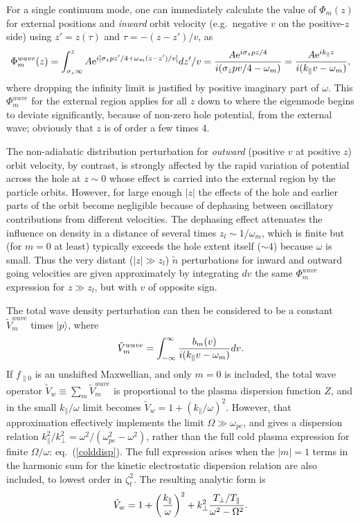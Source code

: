 \documentclass{jpp}
\def\ket#1{|#1\rangle}
\begin{document}
For a single continuum mode, one can immediately calculate the value
of $\Phi_m(z)$ for external positions and \emph{inward}
orbit velocity (e.g.\ negative $v$ on the positive-$z$ side) using
$z'=z(\tau)$ and $\tau=-(z-z')/v$, as
\begin{equation}
  \label{Phiwave}
  \Phi_{m}^{wave}(z) = \int_{\sigma_z\infty}^zA{\rm e}^{i[\sigma_zpz'/4+\omega_m
    (z-z')/v]}dz'/v
  ={A{\rm e}^{i\sigma_zpz/4} \over i(\sigma_zpv/4-\omega_m)}={A{\rm e}^{ik_\parallel z} \over
    i(k_\parallel v-\omega_m)},
\end{equation}
where dropping the infinity limit is justified by positive imaginary
part of $\omega$.  This $\Phi_{m}^{wave}$ for the external 
region applies for all $z$ down to where the eigenmode begins to
deviate significantly, because of non-zero hole potential, from the
external wave; obviously that $z$ is of order a few times 4.

The non-adiabatic distribution perturbation for \emph{outward}
(positive $v$ at positive $z$) orbit velocity, by contrast, is
strongly affected by the rapid variation of potential across the hole
at $z\sim 0$ whose effect is carried into the external region by the
particle orbits. However, for large enough $|z|$ the effects of the
hole and earlier parts of the orbit become negligible because of
dephasing between oscillatory contributions from different
velocities. The dephasing effect attenuates the influence on density
in a distance of several times $z_l\sim 1/\omega_m$, which is finite
but (for $m=0$ at least) typically exceeds the hole extent itself
($\sim 4$) because $\omega$ is small.  Thus the very distant
($|z|\gg z_l$) $\tilde n$ perturbations for inward and outward going
velocities are given approximately by integrating $dv$ the same
$\Phi_m^{wave}$ expression for $z\gg z_l$, but with $v$ of opposite
sign.

The total wave density perturbation can then be considered to be a
constant $\tilde V_m^{wave}$ times $\ket{p}$, where
\begin{equation}
  \label{vmwave}
  \tilde V_m^{wave}= \int_{-\infty}^\infty { b_m(v) \over
    i(k_\parallel v-\omega_m)} dv.
\end{equation}
If $f_{\parallel0}$ is an unshifted Maxwellian, and only $m=0$ is
included, the total wave operator
$\tilde V_w\equiv \sum_m\tilde V_m^{wave}$ is proportional to the
plasma dispersion function $Z$, and in the small $k_\parallel/\omega$
limit becomes $\tilde V_w=1+(k_\parallel/\omega)^2$.  However, that
approximation effectively implements the limit
$\Omega\gg \omega_{pe}$, and gives a dispersion relation
$k_\parallel^2/k_\perp^2 = \omega^2/(\omega_{pe}^2-\omega^2)$, rather
than the full cold plasma expression for finite $\Omega/\omega$: eq.\
(\ref{colddisp}). The full expression arises when the $|m|=1$ terms in
the harmonic sum for the kinetic electrostatic dispersion
relation
\citep[see, e.g.][section 4.4.]{Swanson1989}  are also included, to lowest
order in $\zeta_t^2$. The resulting analytic form
is
\begin{equation}
  \label{Vwanal}
  \tilde V_w= 1 + \left(k_\parallel\over\omega\right)^2 +
  k_\perp^2 {T_\perp/T_\parallel\over\omega^2-\Omega^2}.
\end{equation}
\end{document}
